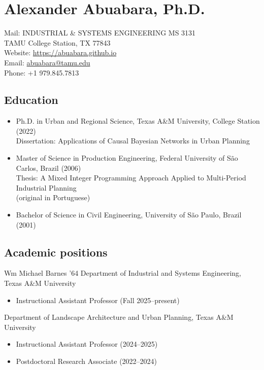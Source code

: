 \documentclass[11pt,oneside]{article}
\begin{document}
\pagestyle{firstpage}
\raggedright

\section*{Alexander Abuabara, Ph.D.}
Mail: INDUSTRIAL \& SYSTEMS ENGINEERING MS 3131\\
\hspace{0.9cm} TAMU College Station, TX 77843\\[1pt]
Website: \url{https://abuabara.github.io}\\[1pt]
Email: \href{abuabara@tamu.edu}{abuabara@tamu.edu}\\[1pt]
Phone: +1 979.845.7813

\subsection*{Education}
\begin{itemize}[leftmargin=20pt]
\item Ph.D. in Urban and Regional Science, Texas A\&M University, College Station (2022)\\[1pt]
      Dissertation: Applications of Causal Bayesian Networks in Urban Planning
\item Master of Science in Production Engineering, Federal University of São Carlos, Brazil (2006)\\[1pt]
      Thesis: A Mixed Integer Programming Approach Applied to Multi-Period Industrial Planning\\
      {\small (original in Portuguese)}
\item Bachelor of Science in Civil Engineering, University of São Paulo, Brazil (2001)
\end{itemize}

\subsection*{Academic positions}
{Wm Michael Barnes ’64 Department of Industrial and Systems Engineering, Texas A\&M University}
\begin{itemize}[leftmargin=20pt]
\item Instructional Assistant Professor (Fall 2025--present)
\end{itemize}

\vspace{3pt}

{Department of Landscape Architecture and Urban Planning, Texas A\&M University}
\begin{itemize}[leftmargin=20pt]
\item Instructional Assistant Professor (2024--2025)
\item Postdoctoral Research Associate (2022--2024)
\end{itemize}
\end{document}
